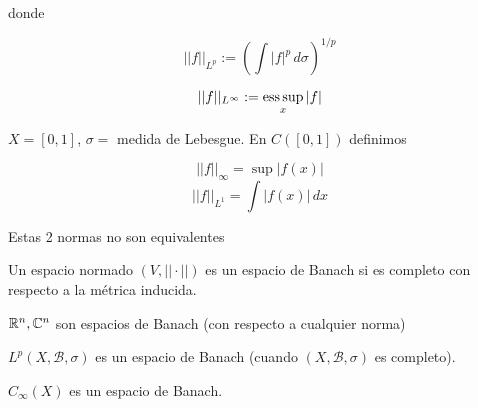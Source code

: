 donde 

\[||f||_{L^p}:= \left(\int |f|^p\,d\sigma\right)^{1/p}\]

\[||f||_{L^\infty}:=\operatorname*{ess\,sup}_x |f|\]

\begin{fexample}
    $X=[0,1]$, $\sigma=$ medida de Lebesgue. En $C([0,1])$ definimos

    \[||f||_\infty =\sup |f(x)|\]
    \[||f||_{L^1}=\int |f(x)|\,dx\]

    Estas 2 normas \color{red} no son equivalentes \color{black}
\end{fexample}

\begin{fdefinition}
    Un espacio normado $(V,||\cdot||)$ es un espacio de Banach si es \color{red} completo \color{black} con respecto a la métrica inducida.
\end{fdefinition}

\begin{fexample}
    $\mathbb{R}^n,\mathbb{C}^n$ son espacios de Banach (con respecto a cualquier norma)
    
    $L^p(X,\mathcal{B},\sigma)$ es un espacio de Banach (cuando $(X,\mathcal{B},\sigma)$ es completo).
\end{fexample}

\begin{fproposition}
    $C_\infty(X)$ es un espacio de Banach.
\end{fproposition}

